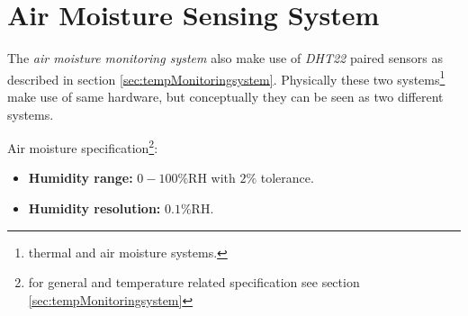 \documentclass[../../main]{subfiles}
\begin{document}
\section{Air Moisture Sensing System} \label{sec:}

The \emph{air moisture monitoring system} also make use of \emph{DHT22} paired sensors
as described in section \ref{sec:tempMonitoringsystem}. Physically these two
systems\footnote{thermal and air moisture systems.} make use of same hardware,
but conceptually they can be seen as two different systems.

Air moisture specification\footnote{for general and temperature related specification
see section \ref{sec:tempMonitoringsystem}}:

\begin{itemize}
    \item \textbf{Humidity range:} $0-100\%$RH with $2\%$ tolerance.
    \item \textbf{Humidity resolution:} $0.1\%$RH.
\end{itemize}

\end{document}
